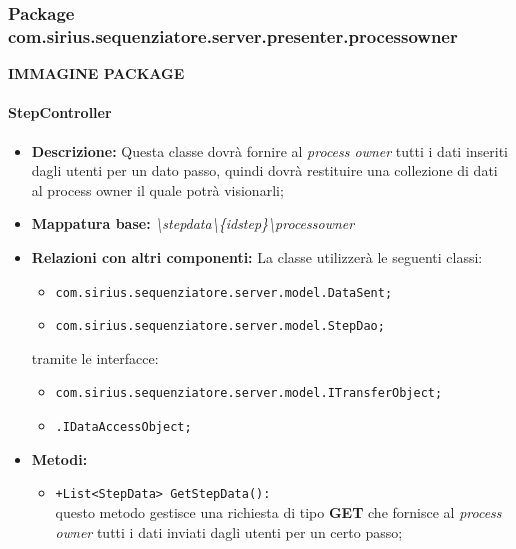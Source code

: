 \subsubsection{Package com.sirius.sequenziatore.server.presenter.processowner}
\textbf{IMMAGINE PACKAGE}
\paragraph{StepController}%
\begin{itemize}
	\item \textbf{Descrizione: } Questa classe dovrà fornire al \textit{process owner} tutti i dati inseriti dagli utenti per un dato passo, quindi dovrà restituire una collezione di dati al process owner il quale potrà visionarli;
	\item \textbf{Mappatura base: } \textit{\textbackslash stepdata\textbackslash \{idstep\}\textbackslash processowner}
	\item \textbf{Relazioni con altri componenti: }
	La classe utilizzerà le seguenti classi:
	\begin{itemize}
		\item \texttt{com.sirius.sequenziatore.server.model.DataSent;}
		\item \texttt{com.sirius.sequenziatore.server.model.StepDao;}
	\end{itemize}
	tramite le interfacce:
	\begin{itemize}
		\item \texttt{com.sirius.sequenziatore.server.model.ITransferObject;}
		\item \texttt{\sModel .IDataAccessObject;}
	\end{itemize}
	\item \textbf{Metodi: }\begin{itemize}
					\item \texttt{+List<StepData> GetStepData():}\\
					questo metodo gestisce una richiesta di tipo \textbf{GET} che fornisce al \textit{process owner} tutti i dati inviati dagli utenti per un certo passo;
				\end{itemize}
\end{itemize}
